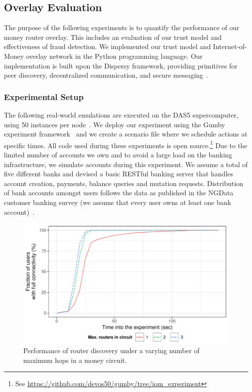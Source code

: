 \subsection{Overlay Evaluation}
The purpose of the following experiments is to quantify the performance of our money router overlay.
This includes an evaluation of our trust model and effectiveness of fraud detection.
We implemented our trust model and Internet-of-Money overlay network in the Python programming language.
Our implementation is built upon the Dispersy framework, providing primitives for peer discovery, decentralized communication, and secure messaging~\cite{zeilemaker2013dispersy}.

\subsubsection*{Experimental Setup}
The following real-world emulations are executed on the DAS5 supercomputer, using 50 instances per node~\cite{bal2016medium}.
We deploy our experiment using the Gumby experiment framework~\cite{gumby} and we create a scenario file where we schedule actions at specific times.
All code used during these experiments is open source.\footnote{See \url{https://github.com/devos50/gumby/tree/iom\_experiment}}
Due to the limited number of accounts we own and to avoid a large load on the banking infrastructure, we simulate accounts during this experiment.
We assume a total of five different banks and devised a basic RESTful banking server that handles account creation, payments, balance queries and mutation requests.
Distribution of bank accounts amongst users follows the data as published in the NGData customer banking survey (we assume that every user owns at least one bank account)~\cite{ngdata2014consumer}.

\begin{figure}[!t]
	\centering
	\includegraphics[width=.8\linewidth]{iom/assets/router_discovery_times}
	\caption{Performance of router discovery under a varying number of maximum hops in a money circuit.}
	\label{fig:router_discovery_times}
\end{figure}

